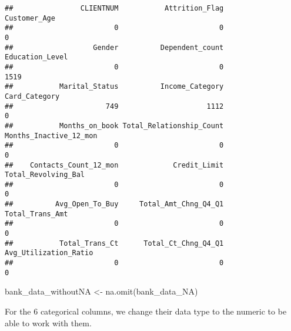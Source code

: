 \documentclass[
]{article}
\newenvironment{Shaded}{\begin{snugshade}}{\end{snugshade}}
\newcommand{\FunctionTok}[1]{\textcolor[rgb]{0.00,0.00,0.00}{#1}}
\newcommand{\NormalTok}[1]{#1}
\newcommand{\OtherTok}[1]{\textcolor[rgb]{0.56,0.35,0.01}{#1}}
\begin{document}
\begin{verbatim}
##                CLIENTNUM           Attrition_Flag             Customer_Age 
##                        0                        0                        0 
##                   Gender          Dependent_count          Education_Level 
##                        0                        0                     1519 
##           Marital_Status          Income_Category            Card_Category 
##                      749                     1112                        0 
##           Months_on_book Total_Relationship_Count   Months_Inactive_12_mon 
##                        0                        0                        0 
##    Contacts_Count_12_mon             Credit_Limit      Total_Revolving_Bal 
##                        0                        0                        0 
##          Avg_Open_To_Buy     Total_Amt_Chng_Q4_Q1          Total_Trans_Amt 
##                        0                        0                        0 
##           Total_Trans_Ct      Total_Ct_Chng_Q4_Q1    Avg_Utilization_Ratio 
##                        0                        0                        0
\end{verbatim}

\begin{Shaded}
\begin{Highlighting}[]
\NormalTok{bank\_data\_withoutNA }\OtherTok{\textless{}{-}} \FunctionTok{na.omit}\NormalTok{(bank\_data\_NA)}
\end{Highlighting}
\end{Shaded}

For the 6 categorical columns, we change their data type to the numeric
to be able to work with them.
\end{document}
